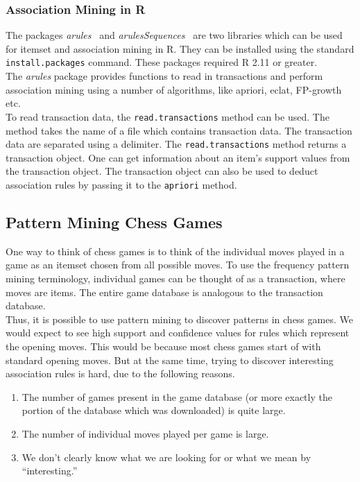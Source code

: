 \documentclass{article}
\begin{document}
\subsubsection{Association Mining in R}

The packages {\sl arules}~\cite{r:arules} and {\sl arulesSequences}~\cite{r:arulesseq} are two libraries which can be used for itemset and association mining in R. They can be installed using the standard \verb=install.packages= command. These packages required R 2.11 or greater.\\

The {\sl arules} package provides functions to read in transactions
and perform association mining using a number of algorithms, like
apriori, eclat, FP-growth etc.\\

To read transaction data, the \verb=read.transactions= method can be
used. The method takes the name of a file which contains transaction
data. The transaction data are separated using a delimiter. The
\verb=read.transactions= method returns a transaction object. One can
get information about an item's support values from the transaction
object. The transaction object can also be used to deduct association
rules by passing it to the \verb=apriori= method.

\subsection{Pattern Mining Chess Games}
One way to think of chess games is to think of the individual moves
played in a game as an itemset chosen from all possible moves. To use
the frequency pattern mining terminology, individual games can be
thought of as a transaction, where moves are items. The entire game
database is analogous to the transaction database. \\

Thus, it is possible to use pattern mining to discover patterns in
chess games. We would expect to see high support and confidence values
for rules which represent the opening moves. This would be because
most chess games start of with standard opening moves. But at the same
time, trying to discover interesting association rules is hard, due to
the following reasons.

\begin{enumerate}
\item The number of games present in the game database (or more exactly the portion of the database which was downloaded) is quite large. 

\item The number of individual moves played per game is large.

\item We don't clearly know what we are looking for or what we mean by  ``interesting.''

\end{enumerate}
\end{document}

